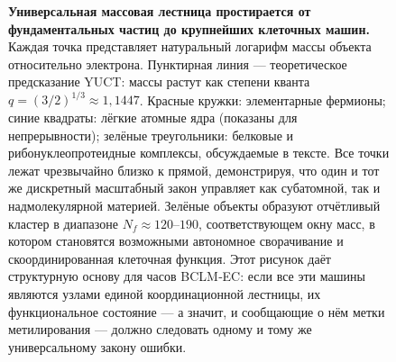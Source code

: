 \documentclass[12pt,a4paper]{article}
\begin{document}
\begin{figure}[H]
		\caption{\textbf{Универсальная массовая лестница простирается от фундаментальных частиц до крупнейших клеточных машин.} 
			Каждая точка представляет натуральный логарифм массы объекта относительно электрона. 
			Пунктирная линия — теоретическое предсказание YUCT: массы растут как степени кванта \(q = (3/2)^{1/3} \approx 1,1447\). 
			Красные кружки: элементарные фермионы; синие квадраты: лёгкие атомные ядра (показаны для непрерывности); зелёные треугольники: белковые и рибонуклеопротеидные комплексы, обсуждаемые в тексте. 
			Все точки лежат чрезвычайно близко к прямой, демонстрируя, что один и тот же дискретный масштабный закон управляет как субатомной, так и надмолекулярной материей. 
			Зелёные объекты образуют отчётливый кластер в диапазоне \(N_f \approx 120\)--\(190\), соответствующем окну масс, в котором становятся возможными автономное сворачивание и скоординированная клеточная функция. 
			Этот рисунок даёт структурную основу для часов BCLM‑EC: если все эти машины являются узлами единой координационной лестницы, их функциональное состояние — а значит, и сообщающие о нём метки метилирования — должно следовать одному и тому же универсальному закону ошибки.}
		\label{fig:mass_ladder_bclm}
	\end{figure}
	
\end{document}
